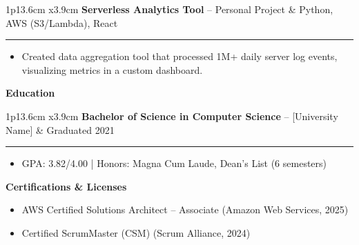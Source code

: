 \documentclass[10pt,a4paper]{article}
\newcommand{\cvsection}[1]{
    \vspace{8pt}
    \begin{center}
        \large\textcolor{sectcol}{\textbf{#1}}
    \end{center}
    \vspace{-4pt}
}
\newcommand{\cvevent}[3]{
    \begin{tabular*}{1\textwidth}{p{13.6cm} x{3.9cm}}
        \textbf{#2} -- \textcolor{bgcol}{#3} & \vspace{2.5pt}\textcolor{sectcol}{#1}
    \end{tabular*}
    \vspace{-8pt}
    \textcolor{softcol}{\hrule}
    \vspace{4pt}
}
\begin{document}
\cvevent{Python, AWS (S3/Lambda), React}{Serverless Analytics Tool}{Personal Project}
\begin{itemize}
    \item Created data aggregation tool that processed 1M+ daily server log events, visualizing metrics in a custom dashboard.
\end{itemize}
\vspace{4pt}

\cvsection{Education}

\cvevent{Graduated 2021}{Bachelor of Science in Computer Science}{[University Name]}
\begin{itemize}
    \item GPA: 3.82/4.00 | Honors: Magna Cum Laude, Dean's List (6 semesters)
\end{itemize}
\vspace{4pt}

\cvsection{Certifications \& Licenses}
\begin{itemize}[leftmargin=0.15in, labelsep=5pt, itemsep=1pt]
    \item AWS Certified Solutions Architect -- Associate (Amazon Web Services, 2025)
    \item Certified ScrumMaster (CSM) (Scrum Alliance, 2024)
\end{itemize}
\end{document}
